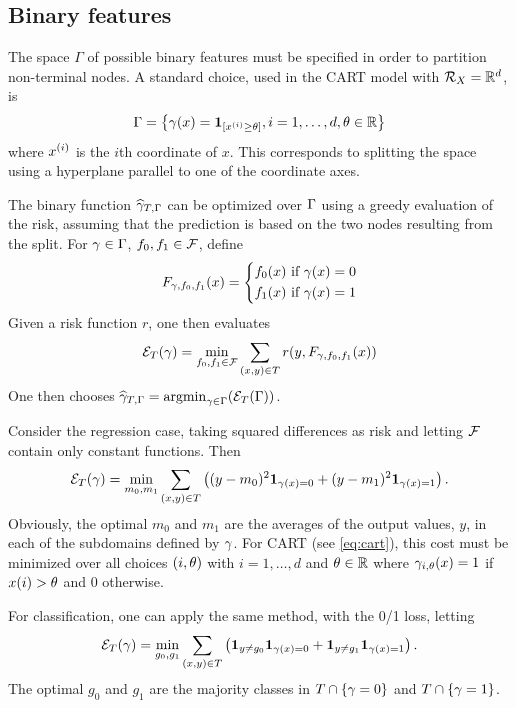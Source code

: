 \subsection{Binary features}
  The space $\Gamma$ of possible binary features must be specified in order to partition non-terminal nodes. A standard choice, used in the CART model \citep{breiman1984classification} with ${\mathcal R}_X = {\mathbb{R}}^d$, is 
\begin{equation}
\label{eq:cart}
\Gamma = \left\{ \gamma(x) = {\bm 1}_{[x^{(i)} \geq \theta]}, i=1, \ldots, d,
\theta \in{\mathbb{R}} \right\}
\end{equation}
where $x^{(i)}$ is the $i$th coordinate of $x$.
 This corresponds to
splitting the space using a hyperplane parallel to one of the coordinate
axes.

 The binary function $\widehat{\gamma}_{T, \Gamma}$ can be optimized over $\Gamma$ using a greedy evaluation of the risk, assuming that the prediction is based on the two nodes resulting from the split. 
 For $\gamma\in \Gamma$, $f_0, f_1\in {\mathcal F}$, define 
\[
F_{\gamma, f_0, f_1}(x) = 
\left\{
\begin{aligned}
f_0(x) \text{ if } \gamma(x) = 0\\
f_1(x) \text{ if } \gamma(x) = 1
\end{aligned}
\right.
\]
  Given a risk function $r$, one then evaluates 
\[
{\mathcal E}_{T}(\gamma) = \min_{f_0, f_1\in {\mathcal F}} \sum_{(x,y)\in T} r(y, F_{\gamma, f_0,f_1}(x))
\]
 One then chooses $\widehat{\gamma}_{T, \Gamma} = \operatorname*{argmin}_{\gamma\in\Gamma} ({\mathcal E}_{T}(\Gamma))$.

\begin{example}[Regression]
Consider the regression case, taking squared differences as risk and letting ${\mathcal F}$ contain only constant functions.
 Then
\[
{\mathcal E}_{T}(\gamma) = \min_{m_0, m_1} \sum_{(x,y)\in T} \left((y-m_0)^2
{\bm 1}_{\gamma(x) = 0} + (y-m_1)^2
{\bm 1}_{\gamma(x) = 1}\right).
\]
Obviously, the optimal $m_0$ and $m_1$ are the averages 
of the output values, $y$, in each of the subdomains defined by $\gamma$.
For CART (see \cref{eq:cart}), this cost must be minimized over all choices $(i, \theta)$ with $i=1, \dots, d$ and $\theta\in {\mathbb{R}}$ where $\gamma_{i,\theta}(x) = 1$ if $x(i) > \theta$ and 0 otherwise.
\end{example}
 
\begin{example}[Classification.]
For classification, one can apply the same method, with the 0/1 loss, letting
\[
{\mathcal E}_{T}(\gamma) = \min_{g_0, g_1} \sum_{(x,y)\in T} \left({\bm 1}_{y\neq g_0}
{\bm 1}_{\gamma(x) = 0} + {\bm 1}_{y\neq g_1}
{\bm 1}_{\gamma(x) = 1}\right).
\]
 The optimal $g_0$ and $g_1$ are the majority classes in $T \cap \{\gamma = 0\}$ and $T \cap \{\gamma = 1\}$.
 \end{example}

